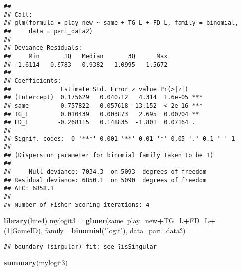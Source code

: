 \documentclass[]{book}
\newenvironment{Shaded}{\begin{snugshade}}{\end{snugshade}}
\newcommand{\KeywordTok}[1]{\textcolor[rgb]{0.13,0.29,0.53}{\textbf{#1}}}
\newcommand{\DataTypeTok}[1]{\textcolor[rgb]{0.13,0.29,0.53}{#1}}
\newcommand{\DecValTok}[1]{\textcolor[rgb]{0.00,0.00,0.81}{#1}}
\newcommand{\StringTok}[1]{\textcolor[rgb]{0.31,0.60,0.02}{#1}}
\newcommand{\OperatorTok}[1]{\textcolor[rgb]{0.81,0.36,0.00}{\textbf{#1}}}
\newcommand{\NormalTok}[1]{#1}
\begin{document}
\begin{verbatim}
## 
## Call:
## glm(formula = play_new ~ same + TG_L + FD_L, family = binomial, 
##     data = pari_data2)
## 
## Deviance Residuals: 
##     Min       1Q   Median       3Q      Max  
## -1.6114  -0.9783  -0.9382   1.0995   1.5672  
## 
## Coefficients:
##              Estimate Std. Error z value Pr(>|z|)    
## (Intercept)  0.175629   0.040712   4.314  1.6e-05 ***
## same        -0.757822   0.057618 -13.152  < 2e-16 ***
## TG_L         0.010439   0.003873   2.695  0.00704 ** 
## FD_L        -0.268115   0.148835  -1.801  0.07164 .  
## ---
## Signif. codes:  0 '***' 0.001 '**' 0.01 '*' 0.05 '.' 0.1 ' ' 1
## 
## (Dispersion parameter for binomial family taken to be 1)
## 
##     Null deviance: 7034.3  on 5093  degrees of freedom
## Residual deviance: 6850.1  on 5090  degrees of freedom
## AIC: 6858.1
## 
## Number of Fisher Scoring iterations: 4
\end{verbatim}

\begin{Shaded}
\begin{Highlighting}[]
\KeywordTok{library}\NormalTok{(lme4)}
\NormalTok{mylogit3 =}\StringTok{ }\KeywordTok{glmer}\NormalTok{(same}\OperatorTok{~}\NormalTok{play_new}\OperatorTok{+}\NormalTok{TG_L}\OperatorTok{+}\NormalTok{FD_L}\OperatorTok{+}\NormalTok{(}\DecValTok{1}\OperatorTok{|}\NormalTok{GameID), }\DataTypeTok{family=} \KeywordTok{binomial}\NormalTok{(}\StringTok{"logit"}\NormalTok{), }\DataTypeTok{data=}\NormalTok{pari_data2)}
\end{Highlighting}
\end{Shaded}

\begin{verbatim}
## boundary (singular) fit: see ?isSingular
\end{verbatim}

\begin{Shaded}
\begin{Highlighting}[]
\KeywordTok{summary}\NormalTok{(mylogit3)}
\end{Highlighting}
\end{Shaded}
\end{document}
